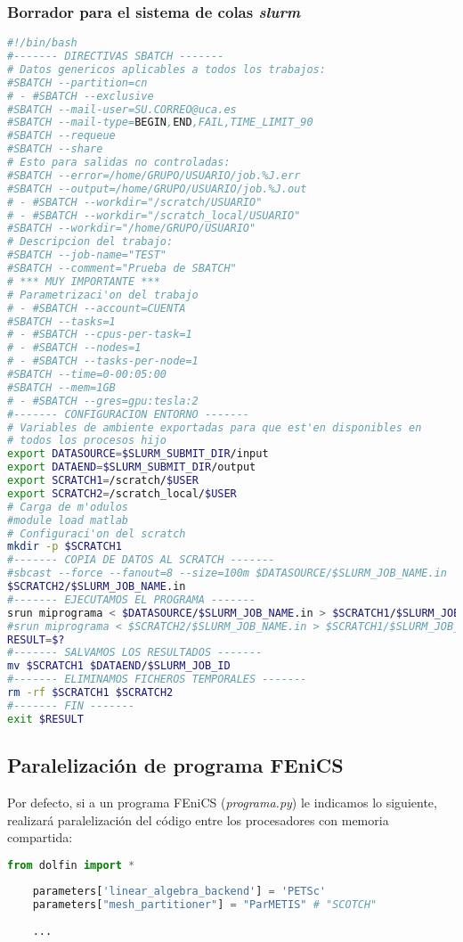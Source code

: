 \subsubsection*{Borrador para el sistema de colas \textit{slurm}}
    \begin{lstlisting}[language=sh]
#!/bin/bash
#------- DIRECTIVAS SBATCH -------
# Datos genericos aplicables a todos los trabajos:
#SBATCH --partition=cn
# - #SBATCH --exclusive
#SBATCH --mail-user=SU.CORREO@uca.es
#SBATCH --mail-type=BEGIN,END,FAIL,TIME_LIMIT_90
#SBATCH --requeue
#SBATCH --share
# Esto para salidas no controladas:
#SBATCH --error=/home/GRUPO/USUARIO/job.%J.err
#SBATCH --output=/home/GRUPO/USUARIO/job.%J.out
# - #SBATCH --workdir="/scratch/USUARIO"
# - #SBATCH --workdir="/scratch_local/USUARIO"
#SBATCH --workdir="/home/GRUPO/USUARIO"
# Descripcion del trabajo:
#SBATCH --job-name="TEST"
#SBATCH --comment="Prueba de SBATCH"
# *** MUY IMPORTANTE ***
# Parametrizaci'on del trabajo
# - #SBATCH --account=CUENTA
#SBATCH --tasks=1
# - #SBATCH --cpus-per-task=1
# - #SBATCH --nodes=1
# - #SBATCH --tasks-per-node=1
#SBATCH --time=0-00:05:00
#SBATCH --mem=1GB
# - #SBATCH --gres=gpu:tesla:2
#------- CONFIGURACION ENTORNO -------
# Variables de ambiente exportadas para que est'en disponibles en
# todos los procesos hijo
export DATASOURCE=$SLURM_SUBMIT_DIR/input
export DATAEND=$SLURM_SUBMIT_DIR/output
export SCRATCH1=/scratch/$USER
export SCRATCH2=/scratch_local/$USER
# Carga de m'odulos
#module load matlab
# Configuraci'on del scratch
mkdir -p $SCRATCH1
#------- COPIA DE DATOS AL SCRATCH -------
#sbcast --force --fanout=8 --size=100m $DATASOURCE/$SLURM_JOB_NAME.in
$SCRATCH2/$SLURM_JOB_NAME.in
#------- EJECUTAMOS EL PROGRAMA -------
srun miprograma < $DATASOURCE/$SLURM_JOB_NAME.in > $SCRATCH1/$SLURM_JOB_NAME.out
#srun miprograma < $SCRATCH2/$SLURM_JOB_NAME.in > $SCRATCH1/$SLURM_JOB_NAME.out
RESULT=$?
#------- SALVAMOS LOS RESULTADOS -------
mv $SCRATCH1 $DATAEND/$SLURM_JOB_ID
#------- ELIMINAMOS FICHEROS TEMPORALES -------
rm -rf $SCRATCH1 $SCRATCH2
#------- FIN -------
exit $RESULT
\end{lstlisting}

\subsection*{Paralelización de programa FEniCS}

Por defecto, si a un programa FEniCS (\textit{programa.py}) le indicamos lo siguiente, realizará paralelización del código entre los procesadores con memoria compartida:
\begin{lstlisting}[language=python]
	from dolfin import *
	
	parameters['linear_algebra_backend'] = 'PETSc'
	parameters["mesh_partitioner"] = "ParMETIS" # "SCOTCH"
	
	...
\end{lstlisting}


